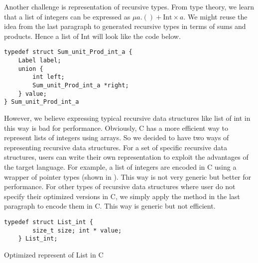 Another challenge is representation of recursive types. From type theory, we learn that a list of integers can be expressed as $\mu a. () + \text{Int} \times a$. We might reuse the idea from the last paragraph to generated recursive types in terms of sums and products. Hence a list of Int will look like the code below.
\begin{verbatim}
typedef struct Sum_unit_Prod_int_a {
    Label label;
    union {
        int left;
        Sum_unit_Prod_int_a *right;
    } value;
} Sum_unit_Prod_int_a
\end{verbatim}
However, we believe expressing typical recursive data structures like list of int in this way is bad for performance. Obviously, C has a more efficient way to represent lists of integers using arrays. So we decided to have two ways of representing recursive data structures. For a set of specific recursive data structures, users can write their own representation to exploit the advantages of the target language. For example, a list of integers are encoded in C using a wrapper of pointer types (shown in ). This way is not very generic but better for performance. For other types of recursive data structures where user do not specify their optimized versions in C, we simply apply the method in the last paragraph to encode them in C. This way is generic but not efficient.
\begin{listing}[ht]
\begin{verbatim}
typedef struct List_int {
        size_t size; int * value;
    } List_int;
\end{verbatim}
\caption{Optimized represent of List in C}
\label{codegen:code:list}
\end{listing}
